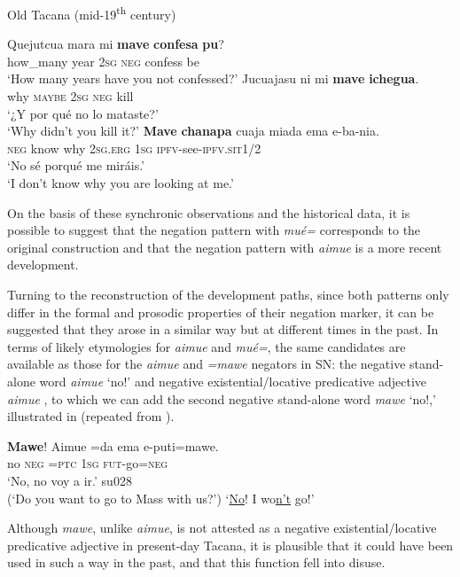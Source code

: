 \documentclass[output=paper]{langsci/langscibook}
\begin{document}
\begin{exe}\ex\label{ex:tacana-old-catecism} Old Tacana
(mid-19\textsuperscript{th} century)
\begin{xlist}
\ex
\gll Quejutcua mara mi \textbf{mave}
\textbf{confesa} \textbf{pu}?\\
    how\_many year \textsc{2sg} \textsc{neg} confess be\\
\glt `How many years have you not confessed?' \parencite[297]{LafoneQuevedo1902}
\ex
\gll Jucuajasu ni mi \textbf{mave}
\textbf{ichegua}.\\
    why  \textsc{maybe}  \textsc{2sg}  \textsc{neg}  kill\\
\glt `¿Y por qué no lo mataste?' \parencite[310]{LafoneQuevedo1902}\\
`Why didn't you kill it?'
\ex
\gll
  \textbf{Mave} \textbf{chanapa} cuaja
  miada ema e-ba-nia.\\
    \textsc{neg}  know  why  \textsc{2sg.erg}  \textsc{1sg}
    \textsc{ipfv}-see-\textsc{ipfv.sit1/2}\\
\glt `No sé porqué me miráis.' \parencite[310]{LafoneQuevedo1902}\\
`I don't know why you are looking at me.'
\end{xlist}\end{exe}
%
On the basis of these synchronic observations and the historical data, it is possible to suggest that the negation pattern with \textit{mué=} corresponds to the original construction and that the negation pattern with \textit{aimue} is a more recent development.

Turning to the reconstruction of the development paths, since both patterns
only differ in the formal and prosodic properties of their negation marker,
it can be suggested that they arose in a similar way but at different
times in the past. In terms of likely etymologies for \textit{aimue} and
\textit{mué=}, the same candidates are available as those for the
\textit{aimue} and \textit{=mawe} negators in SN: the negative stand-alone
word \textit{aimue} `no!'  and negative
existential\slash locative predicative adjective \textit{aimue}
, to which we can add the second negative
stand-alone word \textit{mawe} `no!,' illustrated in
 (repeated from ).
%
\begin{exe}\ex\label{ex:tacana-not-to-mass}
\gll \textbf{Mawe}!  Aimue  =da  ema  e-puti=mawe.\\
    no  \textsc{neg}  \textsc{=ptc}  \textsc{1sg}
    \textsc{fut}-go=\textsc{neg}\\
\glt `No, no voy a ir.' su028\\
(`Do you want to go to Mass with us?') `\underline{No}! I wo\underline{n't} go!'
\end{exe}
%
Although \textit{mawe}, unlike \textit{aimue}, is not attested as a negative existential\slash locative predicative adjective in present-day Tacana, it is plausible that it could have been used in such a way in the past, and that this function fell into disuse.
\end{document}
